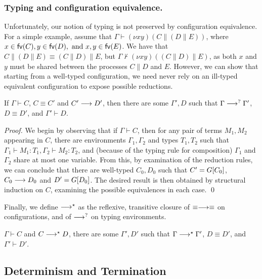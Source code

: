 \documentclass[oribibl,orivec,envcountsame]{llncs}
\begin{document}
\subsubsection{Typing and configuration equivalence.}

Unfortunately, our notion of typing is not preserved by configuration equivalence.  For a simple
example, assume that $\Gamma \vdash (\nu x y)(C \parallel (D \parallel E))$, where $x \in \mathsf{fv}(C), y
\in \mathsf{fv}(D), \text{ and } x,y \in \mathsf{fv}(E)$.  We have that $C \parallel (D \parallel E) \equiv
(C \parallel D) \parallel E$, but $\Gamma \nvdash (\nu x y)((C \parallel D) \parallel E)$, as both
$x$ and $y$ must be shared between the processes $C \parallel D$ and $E$.  However, we can show that
starting from a well-typed configuration, we need never rely on an ill-typed equivalent
configuration to expose possible reductions.
%
\begin{theorem}\label{thm:preservation-equiv}
  If $\Gamma \vdash C$, $C \equiv C'$ and $C' \longrightarrow D'$, then there are some $\Gamma',D$ such that
  $\Gamma \longrightarrow^? \Gamma'$, $D \equiv D'$, and $\Gamma' \vdash D$.
\end{theorem}
%
\begin{proof}
  We begin by observing that if $\Gamma \vdash C$, then for any pair of terms $M_1, M_2$ appearing
  in $C$, there are environments $\Gamma_1,\Gamma_2$ and types $T_1,T_2$ such that $\Gamma_1 \vdash
  M_1 : T_1,\Gamma_2 \vdash M_2 : T_2$, and (because of the typing rule for composition) $\Gamma_1$
  and $\Gamma_2$ share at most one variable.  From this, by examination of the reduction rules, we
  can conclude that there are well-typed $C_0,D_0$ such that $C' = G[C_0]$, $C_0 \longrightarrow D_0$ and
  $D' = G[D_0]$.  The desired result is then obtained by structural induction on $C$, examining
  the possible equivalences in each case. \qed
\end{proof}
%
Finally, we define $\longrightarrow^\star$ as the reflexive, transitive closure of $\equiv\longrightarrow\equiv$ on
configurations, and of $\longrightarrow^?$ on typing environments.
%
\begin{corollary}
  $\Gamma \vdash C$ and $C \longrightarrow^\star D$, there are some $\Gamma',D'$ such that $\Gamma
  \longrightarrow^\star \Gamma'$, $D \equiv D'$, and $\Gamma' \vdash D'$.
\end{corollary}

\subsection{Determinism and Termination}
\end{document}
